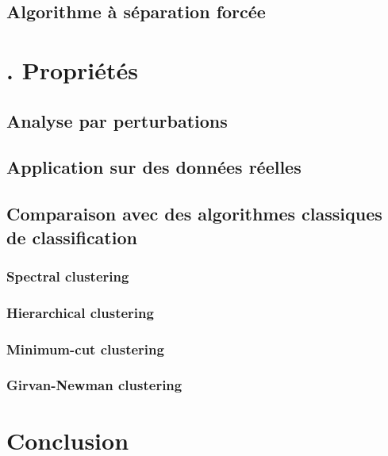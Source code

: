 \documentclass[12pt,a4paper]{report}
\begin{document}
\section{Algorithme à séparation forcée}

\chapter*{\thechapter . Propriétés}

\section{Analyse par perturbations}

\section{Application sur des données réelles}

\section{Comparaison avec des algorithmes classiques de classification}

\subsection*{Spectral clustering}

\subsection*{Hierarchical clustering}

\subsection*{Minimum-cut clustering}

\subsection*{Girvan-Newman clustering}

\chapter*{Conclusion}

\nocite{vandongen00}


\end{document}
